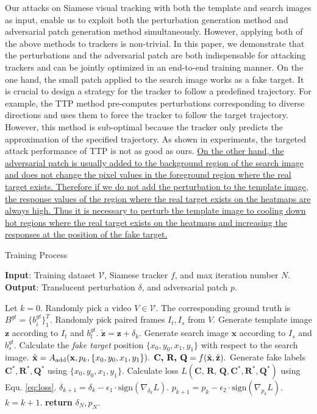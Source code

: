 \documentclass[journal]{IEEEtran}
\begin{document}
Our attacks on Siamese visual tracking with both the template and search images as input, enable us to exploit both the perturbation generation method \cite{FGSM} and adversarial patch generation method \cite{patch} simultaneously. However, applying both of the above methods to trackers is non-trivial. In this paper, we demonstrate that the perturbations and the adversarial patch are both indispensable for attacking trackers and can be jointly optimized in an end-to-end training manner. On the one hand, the small patch applied to the search image works as a fake target. It is crucial to design a strategy for the tracker to follow a predefined trajectory. For example, the TTP method \cite{TTP} pre-computes perturbations corresponding to diverse directions and uses them to force the tracker to follow the target trajectory. However, this method is sub-optimal because the tracker only predicts the approximation of the specified trajectory. As shown in experiments, the targeted attack performance of TTP is not as good as ours.
\uline{On the other hand, the adversarial patch is usually added to the background region of the search image and does not change the pixel values in the foreground region where the real target exists. Therefore if we do not add the perturbation to the template image, the response values of the region where the real target exists on the heatmaps are always high. Thus it is necessary to perturb the template image to cooling down hot regions where the real target exists on the heatmaps and increasing the responses at the position of the fake target.}

\begin{algorithm}[tb]
  \caption{Training Process}
  \label{alg:algorithm}
  \textbf{Input}: Training dataset $\mathcal{V}$, Siamese tracker $f$, and max iteration number $N$.\\
  \textbf{Output}: Translucent perturbation $\delta$, and adversarial patch $p$.
  \begin{algorithmic}[1] %
  \STATE Let $k = 0$.
  \STATE Randomly pick a video $V\in \mathcal{V}$. The corresponding ground truth is $B^{gt}=\{b^{gt}_i\}^T_1$.
  \STATE Randomly pick paired frames $I_t, I_s$ from $V$.
  \STATE Generate template image $\textbf{z}$ according to $I_t$ and $b^{gt}_t$.
  \STATE $\tilde{\textbf{z}} = \textbf{z} + \delta_k.$
  \STATE Generate search image $\textbf{x}$ according to $I_s$ and $b^{gt}_s$.
  \STATE Calculate the \textit{fake target} position $\{x_0, y_0, x_1, y_1\}$ with respect to the search image.
  \STATE $\tilde{\textbf x} = A_{\text{add}}(\textbf x, p_k, \{x_0, y_0, x_1, y_1\}).$
  \STATE $\textbf{C, R, Q} = f(\tilde {\textbf x}, \tilde{\textbf z}).$
  \STATE Generate fake labels $\textbf{C}^*,\textbf{R}^*,\textbf{Q}^*$ using $\{x_0, y_0, x_1, y_1\}$.
  \STATE Calculate loss $L(\textbf{C, R, Q}, \textbf{C}^*, \textbf{R}^*, \textbf{Q}^*)$ using Equ. \ref{eq:loss}.
  \STATE $\delta_{k+1} = \delta_{k} - \epsilon_1 \cdot \text{sign}(\nabla_{\delta_k}L).$
  \STATE $p_{k+1} = p_{k} - \epsilon_2 \cdot \text{sign}(\nabla_{p_k}L).$
  \STATE $k = k + 1.$
  \ENDWHILE
  \STATE \textbf{return} $\delta_N, p_N.$
  \end{algorithmic}
  \label{alg}
\end{algorithm}
\end{document}
